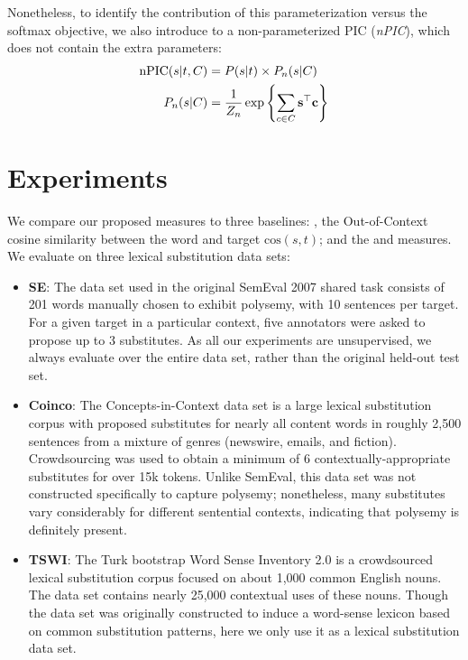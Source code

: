 Nonetheless, to identify the contribution of this parameterization versus the
softmax objective, we also introduce to a non-parameterized PIC ({\em nPIC}),
which does not contain the extra parameters:
\begin{equation}
  \begin{aligned}
  \mbox{nPIC}(s | t, C) &= P(s | t) \times P_n(s | C)\\
  P_n(s | C) &= \frac{1}{Z_n}\exp\left\{\sum_{c\in C}{\mathbf{s}}^\top {\mathbf{c}}\right\}
  \end{aligned}
  \label{eqn:npic}
\end{equation}


\section{Experiments}
We compare our proposed measures to three baselines: \ooc, the Out-of-Context
cosine similarity between the word and target $\mbox{cos}(s, t)$; and the
\mbox{\addCos} and \mbox{\balAddCos} measures.
We evaluate on three lexical substitution data sets:
\begin{itemize}
\item {\bf SE}: The data set used in the original SemEval 2007 shared task
\cite{mccarthy:2007:semeval} consists of 201 words manually chosen to exhibit
polysemy, with 10 sentences per target. For a given target in a particular
context, five annotators were asked to propose up to 3 substitutes. As all our
experiments are unsupervised, we always evaluate over the entire data set,
rather than the original held-out test set.
\item {\bf Coinco}: The Concepts-in-Context data set \cite{kremer:2014:eacl} is a
large lexical substitution corpus with proposed substitutes for nearly all
content words in roughly 2,500 sentences from a mixture of genres (newswire,
emails, and fiction). Crowdsourcing was used to obtain a minimum of 6
contextually-appropriate substitutes for over 15k tokens. Unlike SemEval, this
data set was not constructed specifically to capture polysemy; nonetheless,
many substitutes vary considerably for different sentential contexts,
indicating that polysemy is definitely present.
\item {\bf TSWI}: The Turk bootstrap Word Sense Inventory 2.0 \cite{biemann:2012:lrec}
is a crowdsourced lexical substitution corpus focused on about 1,000 common
English nouns. The data set contains nearly 25,000 contextual uses of these
nouns. Though the data set was originally constructed to induce a word-sense
lexicon based on common substitution patterns, here we only use it as a
lexical substitution data set.
\end{itemize}

